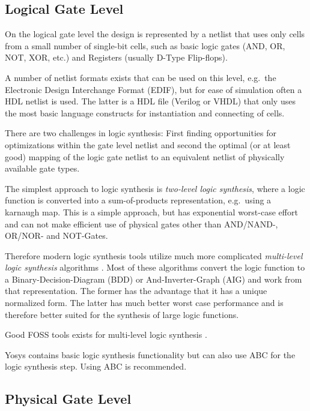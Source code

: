\subsection{Logical Gate Level}

On the logical gate level the design is represented by a netlist that uses only
cells from a small number of single-bit cells, such as basic logic gates (AND,
OR, NOT, XOR, etc.) and Registers (usually D-Type Flip-flops).

A number of netlist formats exists that can be used on this level, e.g.~the Electronic Design
Interchange Format (EDIF), but for ease of simulation often a HDL netlist is used. The latter
is a HDL file (Verilog or VHDL) that only uses the most basic language constructs for instantiation
and connecting of cells.

There are two challenges in logic synthesis: First finding opportunities for optimizations
within the gate level netlist and second the optimal (or at least good) mapping of the logic
gate netlist to an equivalent netlist of physically available gate types.

The simplest approach to logic synthesis is {\it two-level logic synthesis}, where a logic function
is converted into a sum-of-products representation, e.g.~using a karnaugh map.
This is a simple approach, but has exponential worst-case effort and can not make efficient use of
physical gates other than AND/NAND-, OR/NOR- and NOT-Gates.

Therefore modern logic synthesis tools utilize much more complicated {\it multi-level logic
synthesis} algorithms \cite{MultiLevelLogicSynth}. Most of these algorithms convert the
logic function to a Binary-Decision-Diagram (BDD) or And-Inverter-Graph (AIG) and work from that
representation. The former has the advantage that it has a unique normalized form. The latter has
much better worst case performance and is therefore better suited for the synthesis of large
logic functions.

Good FOSS tools exists for multi-level logic synthesis 
 .

Yosys contains basic logic synthesis functionality but can also use ABC
 for the logic synthesis step. Using ABC is recommended.

\subsection{Physical Gate Level}

